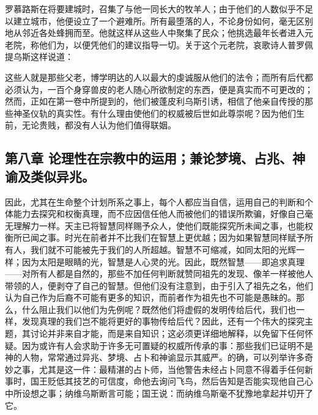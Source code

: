 罗慕路斯在将要建城时，召集了与他一同长大的牧羊人；由于他们的人数似乎不足以建立城市，他便设立了一个避难所。所有最堕落的人，不论身份如何，毫无区别地从邻近各处蜂拥而至。他就这样从这些人中聚集了民众；他挑选最年长者进入元老院，称他们为，以便凭他们的建议指导一切。关于这个元老院，哀歌诗人普罗佩提乌斯这样说道：\par

\par

这些人就是那些父老，博学明达的人以最大的虔诚服从他们的法令；而所有后代都必须认为，一百个身穿兽皮的老人随心所欲制定的东西，便是真实而不可更改的；然而，正如在第一卷中所提到的，他们被蓬皮利乌斯引诱，相信了他亲自传授的那些神圣仪轨的真实性。有什么理由使他们的权威被后世如此尊崇呢？因为他们生前，无论贵贱，都没有人认为他们值得联姻。\par


\subsection{第八章 论理性在宗教中的运用；兼论梦境、占兆、神谕及类似异兆。}

因此，尤其在生命整个计划所系之事上，每个人都应当自信，运用自己的判断和个体能力去探究和权衡真理，而不应因信任他人而被他们的错误所欺骗，好像自己毫无理解力一样。天主已将智慧同样赐予众人，使他们既能探究所未闻之事，也能权衡所已闻之事。时光在前者并不比我们在智慧上更优越；因为如果智慧同样赋予所有人，我们就不可能被先于我们的人所超越。智慧不可缩减，如同太阳的光辉一样；因为太阳是眼睛的光，智慧是人心灵的光。因此，既然智慧——即追求真理——对所有人都是自然的，那些不加任何判断就赞同祖先的发现、像羊一样被他人带领的人，便剥夺了自己的智慧。但他们没有注意到，由于引入了祖先之名，他们认为自己作为后裔不可能有更多的知识，而前者作为祖先也不可能是愚昧的。那么，什么阻止我们以他们为先例呢？既然他们将虚假的发明传给后代，我们也一样，发现真理的我们岂不能将更好的事物传给后代？因此，还有一个伟大的探究主题，其讨论并非来自才能，而是来自知识；这必须更详细地解释，以免留下任何怀疑。因为或许有人会求助于许多无可置疑的权威所传承的事：那些我们已证明不是神的人物，常常通过异兆、梦境、占卜和神谕显示其威严。的确，可以列举许多奇妙之事，尤其是这一件：最精湛的占卜师，当他警告未经占卜同意不得着手任何新事时，国王贬低其技艺的可信度，命他去询问飞鸟，然后告知是否能实现他自己心中所设想之事；纳维乌斯断言可能；国王说：而纳维乌斯毫不犹豫地拿起并切开了它。\par

